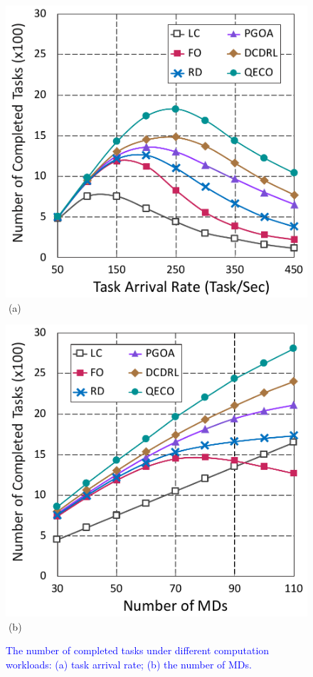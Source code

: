 \documentclass[10pt, journal,letterpaper]{IEEEtran}
\begin{document}
\begin{figure}[tbp]
	\captionsetup{name=Fig.}
	\begin{minipage}[b]{0.5\linewidth}
		\centering
		\includegraphics[width=\textwidth]{ drop_1} 
		\textcolor{white}{i}\hspace{0.6cm}(a)
	\end{minipage}
	\hspace{-0.2cm}
	\begin{minipage}[b]{0.5\linewidth}
		\centering
		\includegraphics[width=\textwidth]{ drop_2}
		\textcolor{white}{i}\hspace{0.6cm}(b)
	\end{minipage}
	\vspace{-0.65cm}
	\caption{\textcolor{blue}{The number of completed tasks under different computation workloads: (a) task arrival rate; (b) the number of MDs.}}
	\label{chart1}
\end{figure}
\end{document}
